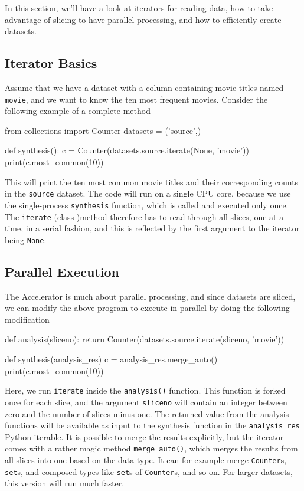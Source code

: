 In this
section, we'll have a look at iterators for reading data, how to take
advantage of slicing to have parallel processing, and how to
efficiently create datasets.

\subsection{Iterator Basics}

Assume that we have a dataset with a column containing movie titles
named \texttt{movie}, and we want to know the ten most frequent
movies.  Consider the following example of a complete method
\begin{python}
from collections import Counter
datasets = ('source',)

def synthesis():
    c = Counter(datasets.source.iterate(None, 'movie'))
    print(c.most_common(10))
\end{python}
This will print the ten most common movie titles and their
corresponding counts in the \texttt{source} dataset.  The code will
run on a single CPU core, because we use the single-process
\texttt{synthesis} function, which is called and executed only once.
The \texttt{iterate} (class-)method therefore has to read through all
slices, one at a time, in a serial fashion, and this is reflected by
the first argument to the iterator being \texttt{None}.


\subsection{Parallel Execution}
The Accelerator is much about parallel processing, and since datasets
are sliced, we can modify the above program to execute in parallel by
doing the following modification
\begin{python}
def analysis(sliceno):
    return Counter(datasets.source.iterate(sliceno, 'movie'))

def synthesis(analysis_res)
    c = analysis_res.merge_auto()
    print(c.most_common(10))
\end{python}
Here, we run \texttt{iterate} inside the \texttt{analysis()} function.
This function is forked once for each slice, and the argument
\texttt{sliceno} will contain an integer between zero and the number
of slices minus one.  The returned value from the analysis functions
will be available as input to the synthesis function in the
\texttt{analysis\_res} Python iterable.  It is possible to merge the
results explicitly, but the iterator comes with a rather magic method
\texttt{merge\_auto()}, which merges the results from all slices into
one based on the data type.  It can for example merge
\texttt{Counter}s, \texttt{set}s, and composed types like
\texttt{set}s of \texttt{Counter}s, and so on.  For larger datasets,
this version will run much faster.



